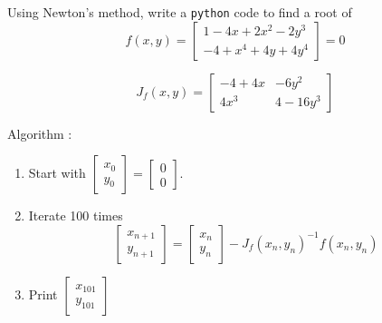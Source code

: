 \documentclass{beamer}
\begin{document}
\begin{frame}
Using Newton's method, write a \texttt{python} code to find a root of 
\begin{equation}
	f(x,y) = 
	\begin{bmatrix}
		1 - 4x + 2x^2 - 2y^3\\
		-4 + x^4 + 4y + 4y^4
	\end{bmatrix}
	= 0
\end{equation}

\begin{equation}
	J_f(x,y) = 
	\begin{bmatrix}
		-4 + 4x & -6y^2\\
		4x^3 & 4 -16y^3
	\end{bmatrix}
\end{equation}

Algorithm : 
\begin{enumerate}
	\item Start with $\begin{bmatrix}
		 	x_{0}\\y_{0}
		 \end{bmatrix} 
	= 
	\begin{bmatrix}
		0 \\ 0
	\end{bmatrix}$.
	\item Iterate 100 times
	\begin{equation}
		\begin{bmatrix}
		 	x_{n+1}\\y_{n+1}
		 \end{bmatrix} 
		 = 
		 \begin{bmatrix}
		 	x_{n}\\y_{n}
		 \end{bmatrix} 
		 - J_f(x_n, y_n)^{-1}f(x_n, y_n)
	\end{equation}
	\item Print $\begin{bmatrix}
		 	x_{101}\\y_{101}
		 \end{bmatrix} $
\end{enumerate}

\end{frame}
\end{document}
